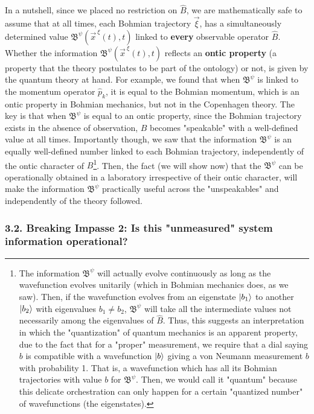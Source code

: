 \documentclass[11pt, a4paper]{article} %
\newcommand{\B}{\mathfrak{B}}
\begin{document}
In a nutshell, since we placed no restriction on $\hat{B}$, we are mathematically safe to assume that at all times, each Bohmian trajectory $\vec{\xi}$, has a simultaneously determined value $\B^\psi(\vec{x}^{\:\xi}(t),t)$ linked to {\bf every} observable operator $\hat{B}$. Whether the information $\B^\psi(\vec{x}^{\:\xi}(t),t)$ reflects an \textbf{ontic property} (a property that the theory postulates to be part of the ontology) or not, is given by the quantum theory at hand. For example, we found that when $\B^\psi$ is linked to the momentum operator $\hat{p}_k$, it is equal to the Bohmian momentum, which is an ontic property in Bohmian mechanics, but not in the Copenhagen theory. The key is that when $\B^\psi$ is equal to an ontic property, since the Bohmian trajectory exists in the absence of observation, $B$ becomes "speakable" with a well-defined value at all times. Importantly though, we saw that the information $\B^\psi$ is an equally well-defined number linked to each Bohmian trajectory, independently of the ontic character of $B$\footnote{The information $\B^\psi$ will actually evolve continuously as long as the wavefunction evolves unitarily (which in Bohmian mechanics does, as we saw). Then, if the wavefunction evolves from an eigenstate $\ket{b_1}$ to another $\ket{b_2}$ with eigenvalues $b_1\neq b_2$, $\B^\psi$ will take all the intermediate values not necessarily among the eigenvalues of $\hat{B}$. Thus, this suggests an interpretation in which the "quantization" of quantum mechanics is an apparent property, due to the fact that for a "proper" measurement, we require that a dial saying $b$ is compatible with a wavefunction $\ket{b}$ giving a von Neumann measurement $b$ with probability 1. That is, a wavefunction which has all its Bohmian trajectories with value $b$ for $\B^\psi$. Then, we would call it "quantum" because this delicate orchestration can only happen for a certain "quantized number" of wavefunctions (the eigenstates).}. Then, the fact (we will show now) that the $\B^\psi$ can be operationally obtained in a laboratory irrespective of their ontic character, will make the information $\B^\psi$ practically useful across the "unspeakables" and independently of the theory followed.
\vspace{-0.55cm}

 
\subsubsection*{3.2. Breaking Impasse 2: Is this "unmeasured" system information operational?}\vspace{-0.15cm}
\end{document}
